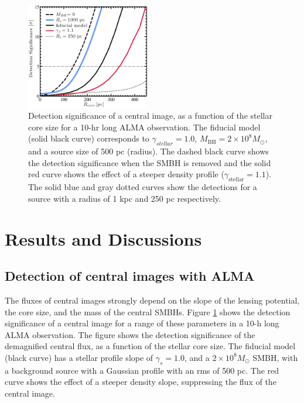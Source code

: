 \documentclass[chicago]{emulateapj}
\begin{document}
\begin{figure}
\begin{center}
\centering
\includegraphics[trim= 0 0 0 0, clip,width=0.48\textwidth]{figures/f_03.eps}
\centering
\end{center}
\caption{ Detection significance of a central image, as a function of the stellar core size for a 10-hr long ALMA observation. 
The fiducial model (solid black curve) corresponds to $\gamma_{stellar}=1.0$, $M_{\mathrm{BH}}=2\times10^8 M_{\odot}$, and a source size of 500 pc (radius). The dashed black curve shows the detection significance when the SMBH is removed and the solid red curve shows the effect of a steeper density profile ($\gamma_{\mathrm{stellar}}=1.1$). The solid blue and gray dotted curves show the detections for a source with a radius of 1 kpc and 250 pc respectively. 
\label{fig:3}}
\end{figure}

\section{Results and Discussions}
\subsection{Detection of central images with ALMA}
The fluxes of central images strongly depend on the slope of the lensing potential, the core size, and the mass of the central SMBHs.  Figure \ref{fig:3} shows the detection significance of a central image for a range of these parameters in a 10-h long ALMA observation. 
The figure shows the detection significance of the demagnified central flux, as a function of the stellar core size.
The fiducial model (black curve) has a stellar profile slope of $\gamma_s=1.0$, and a $2\times10^8M_{\odot}$ SMBH, with a background source 
with a Gaussian profile with an rms of 500 pc.  The red curve shows the effect of a steeper density slope, suppressing the flux of the central image. 
\end{document}
